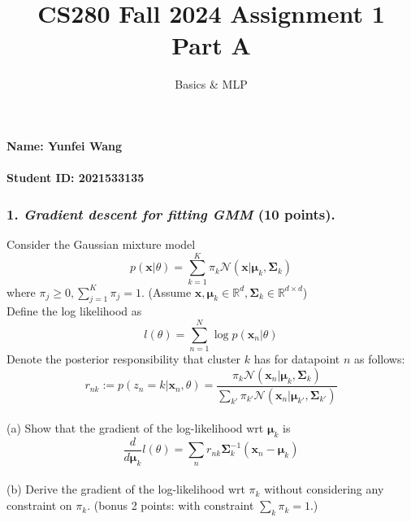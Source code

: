 \documentclass[12pt]{article}%
\begin{document}
\title{CS280 Fall 2024 Assignment 1 \\ Part A}
\author{Basics \& MLP}
\maketitle

\paragraph{Name: Yunfei Wang}

\paragraph{Student ID: 2021533135}

\newpage


\subsubsection*{1. \textit{Gradient descent for fitting GMM} (10 points).}
Consider the Gaussian mixture model
\[p(\mathbf{x}|\theta)=\sum_{k=1}^K \pi_k \mathcal{N}(\mathbf{x}|\boldsymbol{\mu}_k,\boldsymbol{\Sigma}_k)\]
\indent where $\pi_j\geq 0, \sum_{j=1}^K\pi_j = 1$. (Assume $\mathbf{x},\boldsymbol{\mu}_k\in \mathbb{R}^d,\boldsymbol{\Sigma}_k\in \mathbb{R}^{d\times d}$)
\vspace{1em}
\\
 Define the log likelihood as
\[ l(\theta) = \sum_{n=1}^N \log p(\mathbf{x}_n|\theta)
\]
 Denote the posterior responsibility that cluster $k$ has for datapoint $n$ as follows:
\[
r_{nk}:=p(z_n=k|\mathbf{x}_n,\theta) = \frac{\pi_k\mathcal{N}(\mathbf{x}_n|\boldsymbol{\mu}_k,\boldsymbol{\Sigma}_k)}{\sum_{k'}\pi_{k'}\mathcal{N}(\mathbf{x}_n|\boldsymbol{\mu}_{k'},\boldsymbol{\Sigma}_{k'})}
\]
\\
(a) Show that the gradient of the log-likelihood wrt $\boldsymbol{\mu}_k$ is
	\[ \frac{d}{d\boldsymbol{\mu}_k}l(\theta) = \sum_n r_{nk}\boldsymbol{\Sigma}_k^{-1}(\mathbf{x}_n-\boldsymbol{\mu}_k)
	\]
	\\
	(b) Derive the gradient of the log-likelihood wrt $\pi_k$ without considering any constraint on $\pi_k$. (bonus 2 points: with constraint $\sum_k\pi_k=1$.)
\pagebreak
\end{document}
